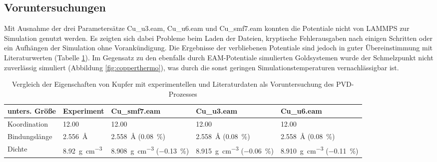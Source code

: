 \subsection{Voruntersuchungen}

Mit Ausnahme der drei Parametersätze Cu\_u3.eam, Cu\_u6.eam und Cu\_smf7.eam konnten die Potentiale nicht von LAMMPS zur Simulation genutzt werden.
Es zeigten sich dabei Probleme beim Laden der Dateien, kryptische Fehlerausgaben nach einigen Schritten oder ein Aufhängen der Simulation ohne Vorankündigung.
Die Ergebnisse der verbliebenen Potentiale sind jedoch in guter Übereinstimmung mit Literaturwerten (Tabelle \ref{tab:copperpreresults}).
Im Gegensatz zu den ebenfalls durch EAM-Potentiale simulierten Goldsystemen wurde der Schmelzpunkt nicht zuverlässig simuliert (Abbildung \ref{fig:copperthermo}), was durch die sonst geringen Simulationstemperaturen vernachlässigbar ist.

\begin{table}[hbtp]
  \caption[Eigenschaften von Kupfer]{Vergleich der Eigenschaften von Kupfer mit experimentellen und Literaturdaten als Voruntersuchung des PVD-Prozesses}
  \label{tab:copperpreresults}
  \begin{tabularx}{\textwidth}{|lXXXX|}
    \hline
    \textbf{unters. Größe} & \textbf{Experiment} & \textbf{Cu\_smf7.eam} & \textbf{Cu\_u3.eam} & \textbf{Cu\_u6.eam} \\
    \hline
    Koordination   &  \SI{12.00}{} & \SI{12.00}{} & \SI{12.00}{} & \SI{12.00}{} \\
    Bindungslänge  &  \SI{2.556}{\angstrom} & \SI{2.558}{\angstrom} (\SI{0.08}{\percent}) & \SI{2.558}{\angstrom} (\SI{0.08}{\percent}) & \SI{2.558}{\angstrom} (\SI{0.08}{\percent}) \\
    Dichte         & \SI{8.92}{\gram\per\cubic\centi\meter} & \SI{8.908}{\gram\per\cubic\centi\meter} (\SI{-0.13}{\percent}) & \SI{8.915}{\gram\per\cubic\centi\meter} (\SI{-0.06}{\percent}) & \SI{8.910}{\gram\per\cubic\centi\meter}  (\SI{-0.11}{\percent}) \\
    \hline
  \end{tabularx}
\end{table}


